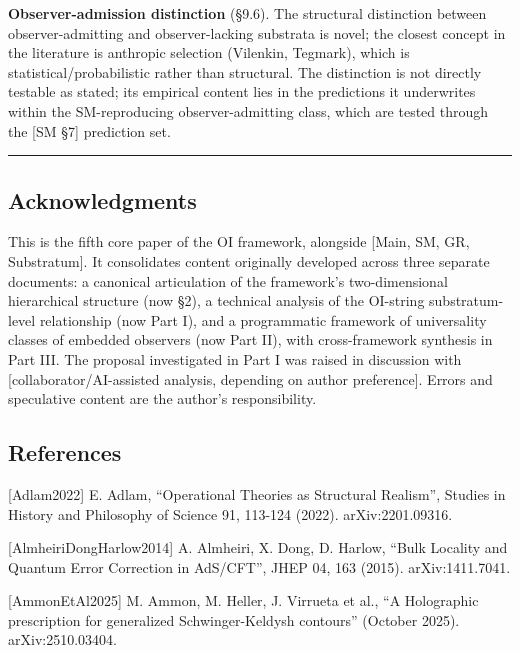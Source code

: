 \documentclass[
]{article}
\begin{document}
\textbf{Observer-admission distinction} (§9.6). The structural
distinction between observer-admitting and observer-lacking substrata is
novel; the closest concept in the literature is anthropic selection
(Vilenkin, Tegmark), which is statistical/probabilistic rather than
structural. The distinction is not directly testable as stated; its
empirical content lies in the predictions it underwrites within the
SM-reproducing observer-admitting class, which are tested through the
{[}SM §7{]} prediction set.

\begin{center}\rule{0.5\linewidth}{0.5pt}\end{center}

\hypertarget{acknowledgments}{%
\subsection{Acknowledgments}\label{acknowledgments}}

This is the fifth core paper of the OI framework, alongside {[}Main, SM,
GR, Substratum{]}. It consolidates content originally developed across
three separate documents: a canonical articulation of the framework's
two-dimensional hierarchical structure (now §2), a technical analysis of
the OI-string substratum-level relationship (now Part I), and a
programmatic framework of universality classes of embedded observers
(now Part II), with cross-framework synthesis in Part III. The proposal
investigated in Part I was raised in discussion with
{[}collaborator/AI-assisted analysis, depending on author preference{]}.
Errors and speculative content are the author's responsibility.

\hypertarget{references}{%
\subsection{References}\label{references}}

{[}Adlam2022{]} E. Adlam, ``Operational Theories as Structural
Realism'', Studies in History and Philosophy of Science 91, 113-124
(2022). arXiv:2201.09316.

{[}AlmheiriDongHarlow2014{]} A. Almheiri, X. Dong, D. Harlow, ``Bulk
Locality and Quantum Error Correction in AdS/CFT'', JHEP 04, 163 (2015).
arXiv:1411.7041.

{[}AmmonEtAl2025{]} M. Ammon, M. Heller, J. Virrueta et al., ``A
Holographic prescription for generalized Schwinger-Keldysh contours''
(October 2025). arXiv:2510.03404.
\end{document}
